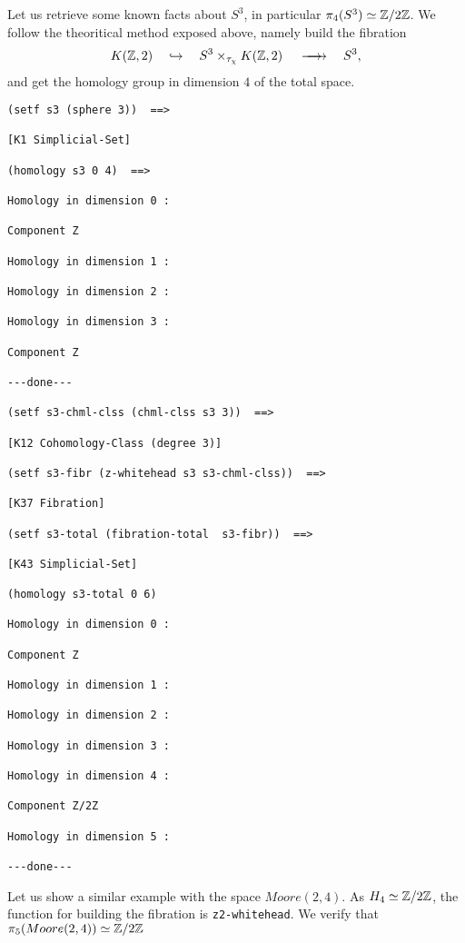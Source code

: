Let us retrieve some known facts about $S^3$, in particular $\pi_4(S^3) \simeq {{\Bbb Z}}/{2 {{\Bbb Z}}}$. 
We follow the theoritical method exposed above, namely  build the fibration
$$  K({{\Bbb Z}},2) \quad \hookrightarrow\quad  S^3 \times_{\tau_\chi} K({{\Bbb Z}},2) \hskip 1.2em 
    \longrightarrow \hskip -1.2em \longrightarrow     \quad S^3,$$
and get the homology group in dimension $4$ of the total space.
{\footnotesize\begin{verbatim}
(setf s3 (sphere 3))  ==>

[K1 Simplicial-Set]

(homology s3 0 4)  ==>

Homology in dimension 0 :

Component Z

Homology in dimension 1 :

Homology in dimension 2 :

Homology in dimension 3 :

Component Z

---done---

(setf s3-chml-clss (chml-clss s3 3))  ==>

[K12 Cohomology-Class (degree 3)]

(setf s3-fibr (z-whitehead s3 s3-chml-clss))  ==>

[K37 Fibration]

(setf s3-total (fibration-total  s3-fibr))  ==>

[K43 Simplicial-Set]

(homology s3-total 0 6)

Homology in dimension 0 :

Component Z

Homology in dimension 1 :

Homology in dimension 2 :

Homology in dimension 3 :

Homology in dimension 4 :

Component Z/2Z

Homology in dimension 5 :

---done---
\end{verbatim}}
Let us show a similar example with the space $Moore(2,4)$. As $H_4 \simeq {{\Bbb Z}}/{2 {{\Bbb Z}}}$, the function
for building the fibration is {\tt z2-whitehead}. 
We verify that $\pi_5(Moore(2,4))\simeq {{\Bbb Z}}/{2 {{\Bbb Z}}}$
